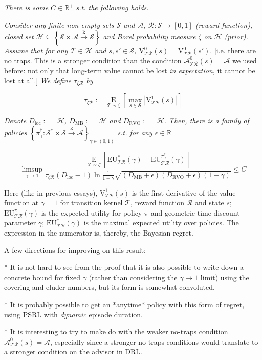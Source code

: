 \documentclass[a4paper]{article}
\newcommand{\Co}[1]{}
\newcommand{\AP}[1]{\left(#1\right)}
\newcommand{\AB}[1]{\left[#1\right]}
\newcommand{\AC}[1]{\left\{#1\right\}}
\newcommand{\Ea}[2]{\underset{#1}{\operatorname{E}}\AB{#2}}
\newcommand{\Reals}{\mathbb{R}}
\newcommand{\Abs}[1]{\left\vert #1 \right\vert}
\newcommand{\K}{\xrightarrow{\mathrm{k}}}
\newcommand{\St}{\mathcal{S}}
\newcommand{\A}{\mathcal{A}}
\newcommand{\R}{\mathcal{R}}
\newcommand{\T}{\mathcal{T}}
\newcommand{\Hy}{\mathcal{H}}
\DeclareMathOperator{\RVO}{\dim_{RVO}}
\DeclareMathOperator{\MB}{\dim_{MB}}
\DeclareMathOperator{\LD}{\dim_{loc}}
\newcommand{\DRVO}{D_{\mathrm{RVO}}}
\newcommand{\DMB}{D_{\mathrm{MB}}}
\newcommand{\DL}{D_{\mathrm{loc}}}
\newcommand{\V}{\mathrm{V}}
\newcommand{\EU}{\mathrm{EU}}
\begin{document}
\textit{There is some $C\in\Reals^+$ s.t. the following holds.}\Co{i}

\textit{Consider any finite non-empty sets $\St$ and $\A$, $\R:\St\rightarrow[0,1]$ (reward function), closed set $\Hy\subseteq\AC{\St\times\A\K\St}$ and Borel probability measure $\zeta$ on $\Hy$ (prior). Assume that for any $\T\in\Hy$ and $s,s'\in\St$, $\V_{\T\R}^0(s)=\V_{\T\R}^0\AP{s'}.$}\Co{i} [i.e. there are no traps. This is a stronger condition than the condition $\A^0_{\T\R}(s) = \A$ we used before: not only that long-term value cannot be lost \textit{in expectation}\Co{i}, it cannot be lost at all.] \textit{We define $\tau_{\zeta\R}$ by}\Co{i}

$$\tau_{\zeta\R}:=\Ea{\T\sim\zeta}{\max_{s\in\St}\Abs{\V^1_{\T\R}(s)}}$$

\textit{Denote $\DL:=\LD{\Hy}$, $\DMB:=\MB{\Hy}$ and $\DRVO:=\RVO{\Hy}$. Then, there is a family of policies $\AC{\pi^\dagger_\gamma:\St^*\times\St\K\A}_{\gamma\in(0,1)}$ s.t. for any $\epsilon\in\Reals^+$}\Co{i}

$$\limsup_{\gamma \rightarrow 1}\frac{\Ea{\T\sim\zeta}{\EU^*_{\T\R}(\gamma)-\EU^{\pi^\dagger_\gamma}_{\T\R}(\gamma)}}{\tau_{\zeta\R}\AP{\DL-1}\ln{\frac{1}{1-\gamma}}\sqrt{\AP{\DMB+\epsilon}\AP{\DRVO+\epsilon}(1-\gamma)}}\leq C$$

Here (like in previous essays), $\V^1_{\T\R}(s)$ is the first derivative of the value function at $\gamma=1$ for transition kernel $\T$, reward function $\R$ and state $s$; $\EU^{\pi}_{\T\R}(\gamma)$ is the expected utility for policy $\pi$ and geometric time discount parameter $\gamma$; $\EU^*_{\T\R}(\gamma)$ is the maximal expected utility over policies. The expression in the numerator is, thereby, the Bayesian regret.

A few directions for improving on this result:

* It is not hard to see from the proof that it is also possible to write down a concrete bound for fixed $\gamma$ (rather than considering the $\gamma\rightarrow 1$ limit) using the covering and eluder numbers, but its form is somewhat convoluted.

* It is probably possible to get an *anytime* policy with this form of regret, using PSRL with \textit{dynamic}\Co{i} episode duration.

* It is interesting to try to make do with the weaker no-traps condition $\A^0_{\T\R}(s) = \A$, especially since a stronger no-traps conditions would translate to a stronger condition on the advisor in DRL.
\end{document}
